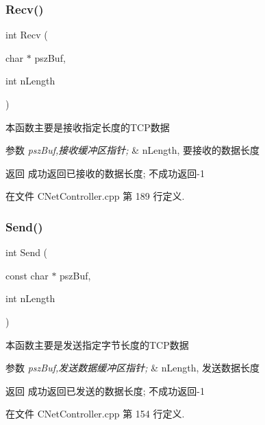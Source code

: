 \subsubsection{\texorpdfstring{Recv()}{Recv()}}
{\footnotesize\ttfamily int Recv (\begin{DoxyParamCaption}\item[{char $\ast$}]{psz\+Buf,  }\item[{int}]{n\+Length }\end{DoxyParamCaption})}



本函数主要是接收指定长度的\+T\+C\+P数据 


\begin{DoxyParams}{参数}
{\em psz\+Buf,接收缓冲区指针;} & n\+Length, 要接收的数据长度\\
\hline
\end{DoxyParams}
\begin{DoxyReturn}{返回}
成功返回已接收的数据长度; 不成功返回-\/1 
\end{DoxyReturn}


在文件 C\+Net\+Controller.\+cpp 第 189 行定义.

\mbox{\label{class_c_net_controller_ac413c9924a1093308dbfdac68ce4bbc4}} 
\subsubsection{\texorpdfstring{Send()}{Send()}}
{\footnotesize\ttfamily int Send (\begin{DoxyParamCaption}\item[{const char $\ast$}]{psz\+Buf,  }\item[{int}]{n\+Length }\end{DoxyParamCaption})}



本函数主要是发送指定字节长度的\+T\+C\+P数据 


\begin{DoxyParams}{参数}
{\em psz\+Buf,发送数据缓冲区指针;} & n\+Length, 发送数据长度\\
\hline
\end{DoxyParams}
\begin{DoxyReturn}{返回}
成功返回已发送的数据长度; 不成功返回-\/1 
\end{DoxyReturn}


在文件 C\+Net\+Controller.\+cpp 第 154 行定义.



